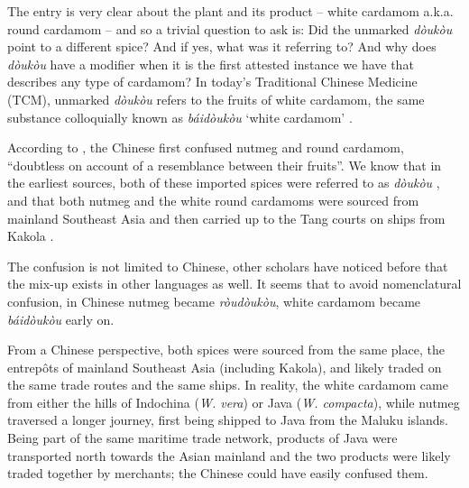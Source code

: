 \documentclass[12pt]{article}
\newcommand{\tc}[1]{\traditionalchinesefont{#1}\rmfamily}
\begin{document}

The entry is very clear about the plant and its product -- white cardamom a.k.a. round cardamom -- and so a trivial question to ask is: Did the unmarked \textit{dòukòu} point to a different spice? And if yes, what was it referring to? And why does \textit{dòukòu} have a modifier when it is the first attested instance we have that describes any type of cardamom? 
In today's Traditional Chinese Medicine (TCM), unmarked \textit{dòukòu} refers to the fruits of white cardamom, the same substance colloquially known as \textit{báidòukòu} `white cardamom' \parencites[cf.][]{polyu_2024_chinese,hkbu_2024_chinese}.



According to \textcite[22]{donkin_2003_east}, the Chinese first confused nutmeg and round cardamom, ``doubtless on account of a resemblance between their fruits''. We know that in the earliest sources, both of these imported spices were referred to as \textit{dòukòu} \parencites{hsu_1967_notes}{donkin_2003_east}, and that both nutmeg and the white round cardamoms were sourced from mainland Southeast Asia and then carried up to the Tang courts on ships from Kakola \parencite[184-185]{schafer_1985_golden}. 


The confusion is not limited to Chinese, other scholars have noticed before \parencite[see][]{wolters_1967_early,wheatley_1961_golden} that the mix-up exists in other languages as well. It seems that to avoid nomenclatural confusion, in Chinese nutmeg became \tc{肉豆蔻} \textit{ròudòukòu}, white cardamom became \tc{白豆蔻} \textit{báidòukòu} early on.

From a Chinese perspective, both spices were sourced from the same place, the entrepôts of mainland Southeast Asia (including Kakola), and likely traded on the same trade routes and the same ships. In reality, the white cardamom came from either the hills of Indochina (\textit{W. vera}) or Java (\textit{W. compacta}), while nutmeg traversed a longer journey, first being shipped to Java from the Maluku islands. Being part of the same maritime trade network, products of Java were transported north towards the Asian mainland and the two products were likely traded together by merchants; the Chinese could have easily confused them.
\end{document}
